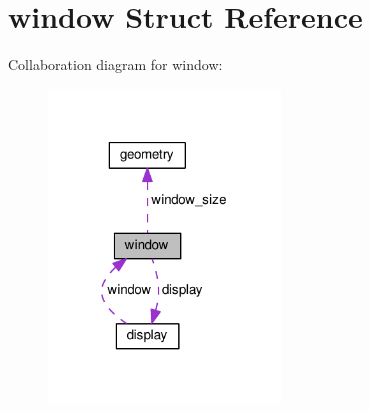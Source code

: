 \hypertarget{structwindow}{\section{window Struct Reference}
\label{structwindow}
}


Collaboration diagram for window\-:
\nopagebreak
\begin{figure}[H]
\begin{center}
\leavevmode
\includegraphics[width=175pt]{structwindow__coll__graph}
\end{center}
\end{figure}

